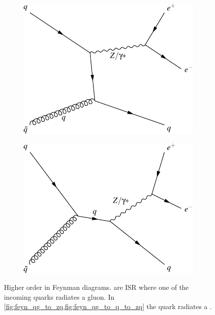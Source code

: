 \begin{figure}[!p]
\begin{subfigure}[b]{\SideBySidePlotWidth}
        \includegraphics[width=\linewidth]{figures/feyn_qg_to_zq.pdf}
        \caption{}
        \label{fig:feyn_qg_to_zq}
    \end{subfigure}%
    \begin{subfigure}[b]{\SideBySidePlotWidth}
        \includegraphics[width=\linewidth]{figures/feyn_qg_to_q_to_zq.pdf}
        \caption{}
        \label{fig:feyn_qg_to_q_to_zq}
    \end{subfigure}
    \caption[
        Higher order in \alphastrong \Ztoee Feynman diagrams.
    ]{
        Higher order in \alphastrong \Ztoee Feynman diagrams.
         are ISR where one of
        the incoming quarks radiates a gluon. In
        \cref{fig:feyn_qg_to_zq,fig:feyn_qg_to_q_to_zq} the quark radiates a
        \Z.
    }
    \label{fig:higher_order_z_diagrams}
\end{figure}
